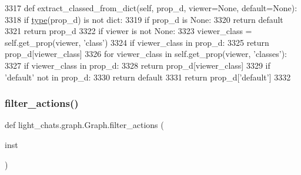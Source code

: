 \begin{DoxyCode}
3317     \textcolor{keyword}{def }extract\_classed\_from\_dict(self, prop\_d, viewer=None, default=None):
3318         \textcolor{keywordflow}{if} \hyperlink{namespaceparlai_1_1agents_1_1tfidf__retriever_1_1build__tfidf_ad5dfae268e23f506da084a9efb72f619}{type}(prop\_d) \textcolor{keywordflow}{is} \textcolor{keywordflow}{not} dict:
3319             \textcolor{keywordflow}{if} prop\_d \textcolor{keywordflow}{is} \textcolor{keywordtype}{None}:
3320                 \textcolor{keywordflow}{return} default
3321             \textcolor{keywordflow}{return} prop\_d
3322         \textcolor{keywordflow}{if} viewer \textcolor{keywordflow}{is} \textcolor{keywordflow}{not} \textcolor{keywordtype}{None}:
3323             viewer\_class = self.get\_prop(viewer, \textcolor{stringliteral}{'class'})
3324             \textcolor{keywordflow}{if} viewer\_class \textcolor{keywordflow}{in} prop\_d:
3325                 \textcolor{keywordflow}{return} prop\_d[viewer\_class]
3326             \textcolor{keywordflow}{for} viewer\_class \textcolor{keywordflow}{in} self.get\_prop(viewer, \textcolor{stringliteral}{'classes'}):
3327                 \textcolor{keywordflow}{if} viewer\_class \textcolor{keywordflow}{in} prop\_d:
3328                     \textcolor{keywordflow}{return} prop\_d[viewer\_class]
3329         \textcolor{keywordflow}{if} \textcolor{stringliteral}{'default'} \textcolor{keywordflow}{not} \textcolor{keywordflow}{in} prop\_d:
3330             \textcolor{keywordflow}{return} default
3331         \textcolor{keywordflow}{return} prop\_d[\textcolor{stringliteral}{'default'}]
3332 
\end{DoxyCode}
\mbox{\label{classlight__chats_1_1graph_1_1Graph_a27cddf5bb9b3718a70a66ac91c22cf96}} 
\subsubsection{\texorpdfstring{filter\+\_\+actions()}{filter\_actions()}}
{\footnotesize\ttfamily def light\+\_\+chats.\+graph.\+Graph.\+filter\+\_\+actions (\begin{DoxyParamCaption}\item[{}]{inst }\end{DoxyParamCaption})\hspace{0.3cm}{\ttfamily [static]}}



